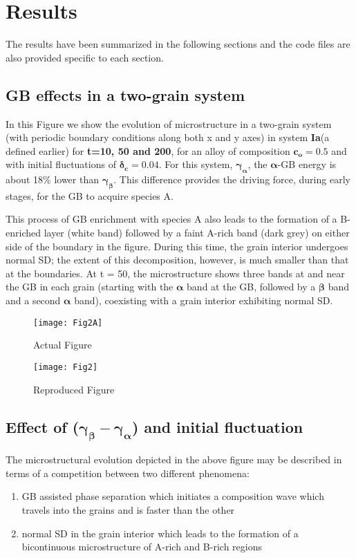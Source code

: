 \chapter{Results}
The results have been summarized in the following sections and the code files are also provided specific to each section.

\section{GB effects in a two-grain system}
In this Figure we show the evolution of microstructure in a two-grain system (with periodic boundary conditions along both x and y axes) in system \textbf{Ia}(a defined earlier) for \textbf{t=10, 50 and 200}, for an alloy of composition $\mathbold{c_o = 0.5}$ and with initial fluctuations of $\mathbold{\delta_c = 0.04}$. For this system, $\mathbold{\gamma_\alpha}$, the $\mathbold{\alpha}$-GB energy is about 18\% lower than $\mathbold{\gamma_\beta}$. This difference provides the driving force, during early stages, for the GB to acquire species A.

This process of GB enrichment with species A also leads to the formation of a B-enriched layer (white band) followed by a faint A-rich band (dark grey) on either side of the boundary in the figure. During this time, the grain interior undergoes normal SD; the extent of this decomposition, however, is much smaller than that at the boundaries. At t = 50, the microstructure shows three bands at and near the GB in each grain (starting with the $\mathbold{\alpha}$ band at the GB, followed by a $\mathbold{\beta}$ band and a second $\mathbold{\alpha}$ band), coexisting with a grain interior exhibiting normal SD.
\begin{figure}[H]
\texttt{[image: Fig2A]}
\caption{Actual Figure}
\end{figure}

\begin{figure}[H]
\texttt{[image: Fig2]}
\caption{Reproduced Figure}
\end{figure}

\section{Effect of ($\mathbold{\gamma_\beta-\gamma_\alpha}$) and initial fluctuation}
The microstructural evolution depicted in the above figure may be described in terms of a competition
between two different phenomena: 
\begin{enumerate}
\item GB assisted phase separation which initiates a composition wave which travels into the grains and is faster than the other
\item normal SD in the grain interior which leads to the formation of a bicontinuous microstructure of A-rich and B-rich regions
\end{enumerate}

